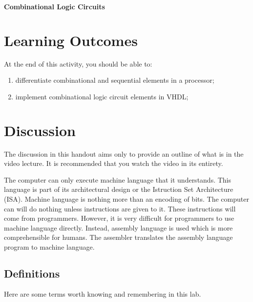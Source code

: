 \documentclass[a4paper, 11pt,oneside]{article}
\begin{document}
\begin{center}
	{\LARGE \textbf{Combinational Logic Circuits}}
\end{center}

\section*{Learning Outcomes}
   At the end of this activity, you should be able to:
   \begin{enumerate}[itemsep=0pt,parsep=0pt]
   	   \item differentiate combinational and sequential elements in a processor;
       \item implement combinational logic circuit elements in VHDL;

   \end{enumerate}   

\tableofcontents

\section{Discussion}
The discussion in this handout aims only to provide an outline of what is in the video lecture. It is recommended that you watch the video in its entirety.

The computer can only execute machine language that it understands. This language is part of its architectural design or the Istruction Set Architecture (ISA). Machine language is nothing more than an encoding of bits. The computer can will do nothing unless instructions are given to it. These instructions will come from programmers. However, it is very difficult for programmers to use machine language directly. Instead, assembly language is used which is more comprehensible for humans. The assembler translates the assembly language program to machine language. 

\subsection{Definitions}
Here are some terms worth knowing and remembering in this lab.
\end{document}
